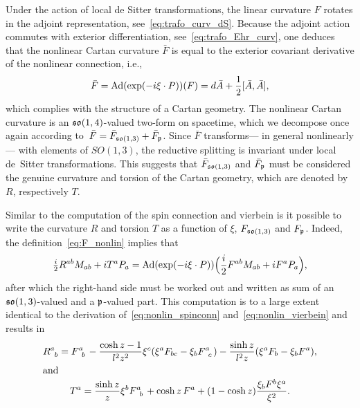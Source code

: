 \documentclass[
final,
11pt,
a4paper,
DIV=11,
headinclude=true,
footinclude=false,
bibliography=totoc,
twoside=true,  %
BCOR=5mm
]{scrbook}
\begin{document}
Under the action of local de Sitter transformations, the linear 
curvature $F$ rotates in the adjoint representation, 
see~\eqref{eq:trafo_curv_dS}. Because the adjoint action commutes 
with exterior differentiation, see~\eqref{eq:trafo_Ehr_curv}, one 
deduces that the nonlinear Cartan curvature $\bar{F}$ is equal to 
the exterior covariant derivative of the nonlinear connection, 
i.e.,
\begin{equation}
\label{eq:F_nonlin}
        \bar{F} = \operatorname{Ad}(\exp(-i\xi\cdot P))(F) = d\bar{A} 
        + \frac{1}{2}[\bar{A},\bar{A}],
\end{equation}
which complies with the structure of a Cartan geometry. The 
nonlinear Cartan curvature is an $\mathfrak{so}(1,4)$-valued two-form 
on spacetime, which we decompose once again according to~$\bar{F} 
= \bar{F}_{\mathfrak{so}(1,3)} + \bar{F}_\mathfrak{p}$. Since $\bar{F}$ 
transforms--- in general nonlinearly--- with elements of 
$SO(1,3)$, the reductive splitting is invariant under local 
de~Sitter transformations. This suggests that 
$\bar{F}_{\mathfrak{so}(1,3)}$ and $\bar{F}_\mathfrak{p}$ must be considered 
the genuine curvature and torsion of the Cartan geometry, which 
are denoted by $R$, respectively $T$.

Similar to the computation of the spin connection and vierbein is 
it possible to write the curvature $R$ and torsion $T$ as 
a function of $\xi$, $F_{\mathfrak{so}(1,3)}$ and $F_\mathfrak{p}$. Indeed, 
the definition~\eqref{eq:F_nonlin} implies that
\begin{equation*}
  \tfrac{i}{2} R^{ab} M_{ab} + i T^a P_a
  = \operatorname{Ad}(\exp(-i\xi\cdot P)) \Big( \frac{i}{2} F^{ab} M_{ab} 
  + i F^a P_a \Big),
\end{equation*}
after which the right-hand side must be worked out and written as 
sum of an $\mathfrak{so}(1,3)$-valued and a $\mathfrak{p}$-valued part. This 
computation is to a large extent identical to the derivation 
of~\eqref{eq:nonlin_spinconn} and~\eqref{eq:nonlin_vierbein} and 
results in
\begin{subequations}
\label{eqs:nonlin_curv_tors}
\begin{gather}
  \label{eq:nonlin_curv}
  R\ind{^a_b} = F\ind{^a_b} - \frac{\cosh z - 1}{l^2 z^2} 
  \xi^c (\xi^a F_{bc} -  \xi_b F\ind{^a_c}) - \frac{\sinh 
    z}{l^2 z} (\xi^a F_b - \xi_b F^a),
  \\
  \intertext{and}
  \label{eq:nonlin_tors}
  T^a = \frac{\sinh z}{z} \xi^b F\ind{^a_b} + \cosh z\, F^a 
  + (1 - \cosh z) \frac{\xi_b F^b \xi^a}{\xi^2}.
\end{gather}
\end{subequations}
\end{document}
